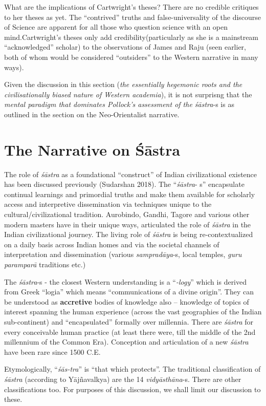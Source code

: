 What are the implications of Cartwright’s theses? There are no credible critiques to her theses as yet. The “contrived” truths and false-universality of the discourse of Science are apparent for all those who question science with an open mind.Cartwright’s theses only add credibility(particularly as she is a mainstream “acknowledged” scholar) to the observations of James and Raju (seen earlier, both of whom would be considered “outsiders” to the Western narrative in many ways).

Given the discussion in this section (\textit{the essentially hegemonic roots and the civilisationally biased nature of Western academia}), it is not surprisng that the \textit{mental paradigm that dominates Pollock’s assessment of the śāstra}-s is as outlined in the section on the Neo-Orientalist narrative.


\section*{The Narrative on Śāstra}

The role of \textit{śāstra} as a foundational “construct” of Indian civilizational existence has been discussed previously (Sudarshan 2018). The “\textit{śāstra}- s” encapsulate continual learnings and primordial truths and make them available for scholarly access and interpretive dissemination via techniques unique to the cultural/civilizational tradition. Aurobindo, Gandhi, Tagore and various other modern masters have in their unique ways, articulated the role of \textit{śāstra} in the Indian civilizational journey. The living role of \textit{śāstra} is being re-contextualized on a daily basis across Indian homes and via the societal channels of interpretation and dissemination (various \textit{sampradāya}-s, local temples, \textit{guru paramparā} traditions etc.)

The \textit{śāstra}-s - the closest Western understanding is a “\textit{-logy}” which is derived from Greek “logia” which means “communications of a divine origin”. They can be understood as \textbf{accretive} bodies of knowledge also – knowledge of topics of interest spanning the human experience (across the vast geographies of the Indian sub-continent) and “encapsulated” formally over millennia. There are \textit{śāstra} for every conceivable human practice (at least there were, till the middle of the 2nd millennium of the Common Era). Conception and articulation of a new \textit{śāstra} have been rare since 1500 C.E.

Etymologically, “\textit{śās-tra}” is “that which protects”. The traditional classification of \textit{śāstra} (according to Yājñavalkya) are the 14 \textit{vidyāsthāna}-s. There are other classifications too. For purposes of this discussion, we shall limit our discussion to these.

